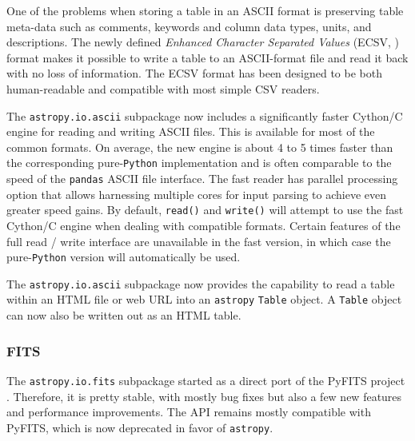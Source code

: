 \documentclass[modern]{aastex61}
\newcommand{\package}[1]{\texttt{#1}\xspace}
\newcommand{\python}{\package{Python}}
\newcommand{\astropypkg}{\package{astropy}}
\begin{document}
One of the problems when storing a table in an ASCII format is
preserving table meta-data such as comments, keywords and column data
types, units, and descriptions. The newly defined \emph{Enhanced
Character Separated Values} (ECSV,  \citealt{ape6}) format makes it
possible to write a table to an ASCII-format file and read it back
with no loss of information. The ECSV format has been designed to be
both human-readable and compatible with most simple CSV readers.


The \package{astropy.io.ascii} subpackage now includes a significantly faster
Cython/C engine for reading and writing ASCII files. This is available for most
of the common formats.  On average, the new engine is about 4 to 5 times faster
than the corresponding pure-\python implementation and is often comparable to
the speed of the \package{pandas} \citep{pandas} ASCII file interface.  The
fast reader has parallel processing option that allows harnessing multiple
cores for input parsing to achieve even greater speed gains.  By default,
\texttt{read()} and \texttt{write()} will attempt to use the fast Cython/C engine
when dealing with compatible formats. Certain features of the full read
/ write interface are unavailable in the fast version, in which case the
pure-\python version will automatically be used.


The \package{astropy.io.ascii} subpackage now provides the capability
to read a table within an HTML file or web URL into an \astropypkg
\texttt{Table} object. A \texttt{Table} object can now also
be written out as an HTML table.

\subsubsection{FITS}

The \package{astropy.io.fits} subpackage started as a direct port of the
PyFITS project \citep{PyFITS}. Therefore, it is pretty stable, with mostly bug
fixes but also a few new features and performance improvements.  The API
remains mostly compatible with PyFITS, which is now deprecated in favor of
\astropypkg.
\end{document}
